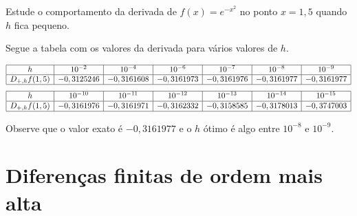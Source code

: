 \begin{Exercise}Estude o comportamento da derivada de $f(x)=e^{-x^2}$ no ponto $x=1,5$ quando $h$ fica pequeno.
\end{Exercise}
\begin{Answer}
  \begin{tiny}
Segue a tabela com os valores da derivada para vários valores de $h$.
\begin{tiny}
\begin{equation*}
\begin{array}{|c|c|c|c|c|c|c|}
\hline
h&10^{-2}&10^{-4}&10^{-6}&10^{-7}&10^{-8}&10^{-9}\\
\hline
D_{+,h}f(1,5)& - 0,3125246&- 0,3161608 &- 0,3161973&- 0,3161976&- 0,3161977&- 0,3161977 \\
\hline
\end{array}  
\end{equation*}  
\begin{equation*}
\begin{array}{|c|c|c|c|c|c|c|}
\hline
h&10^{-10}&10^{-11}&10^{-12}&10^{-13}&10^{-14}&10^{-15}\\
\hline
D_{+,h}f(1,5)&- 0,3161976&- 0,3161971&- 0,3162332&- 0,3158585&- 0,3178013&- 0,3747003\\
\hline
\end{array}
\end{equation*}
\end{tiny}
Observe que o valor exato é $-0,3161977$ e o $h$ ótimo é algo entre $10^{-8}$ e $10^{-9}$.      
  \end{tiny}
\end{Answer}


\section{Diferenças finitas de ordem mais alta}

